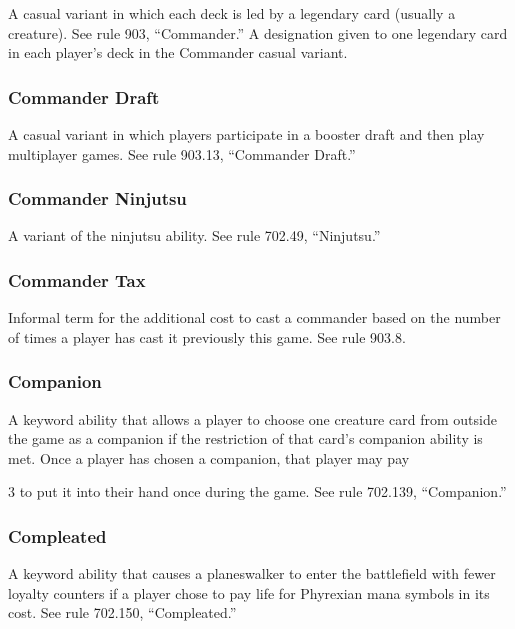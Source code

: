 {{{{{A casual variant in which each deck is led by a legendary card (usually a creature). See rule 903, “Commander.”
A designation given to one legendary card in each player’s deck in the Commander casual variant.

\subsubsection*{Commander Draft}

A casual variant in which players participate in a booster draft and then play multiplayer games. See rule 903.13, “Commander Draft.”

\subsubsection*{Commander Ninjutsu}

A variant of the ninjutsu ability. See rule 702.49, “Ninjutsu.”

\subsubsection*{Commander Tax}

Informal term for the additional cost to cast a commander based on the number of times a player has cast it previously this game. See rule 903.8.

\subsubsection*{Companion}

A keyword ability that allows a player to choose one creature card from outside the game as a companion if the restriction of that card’s companion ability is met. Once a player has chosen a companion, that player may pay {3 to put it into their hand once during the game. See rule 702.139, “Companion.”

\subsubsection*{Compleated}

A keyword ability that causes a planeswalker to enter the battlefield with fewer loyalty counters if a player chose to pay life for Phyrexian mana symbols in its cost. See rule 702.150, “Compleated.”

}}}}}}
